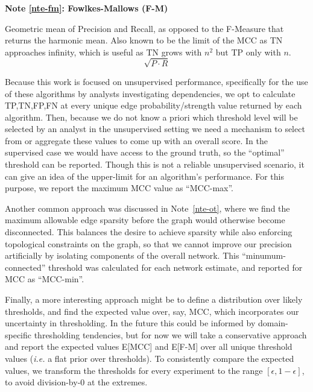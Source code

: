 \documentclass[%
	12pt,
		oneside,
		letterpaper
]{book}
\newcounter{quartocalloutnteno}
\newcommand{\quartocalloutnte}[1]{\refstepcounter{quartocalloutnteno}\label{#1}}
\begin{document}
\begin{tcolorbox}[enhanced jigsaw, bottomrule=.15mm, colback=white, breakable, toprule=.15mm, colframe=quarto-callout-note-color-frame, leftrule=.75mm, arc=.35mm, opacityback=0, rightrule=.15mm, left=2mm]

\quartocalloutnte{nte-fm} 

\vspace{-3mm}\textbf{Note \ref*{nte-fm}: Fowlkes-Mallows (F-M)}\vspace{3mm}

Geometric mean of Precision and Recall, as opposed to the F-Measure that returns the harmonic mean.
Also known to be the limit of the MCC as TN approaches infinity\autocite{MCCapproachesgeometric_Crall2023}, which is useful as TN grows with \(n^2\) but TP only with \(n\).
\[\sqrt{P\cdot R}\]

\end{tcolorbox}

Because this work is focused on unsupervised performance, specifically for the use of these algorithms by analysts investigating dependencies, we opt to calculate TP,TN,FP,FN at every unique edge probability/strength value returned by each algorithm.
Then, because we do not know a priori which threshold level will be selected by an analyst in the unsupervised setting we need a mechanism to select from or aggregate these values to come up with an overall score.
In the supervised case we would have access to the ground truth, so the ``optimal'' threshold can be reported.
Though this is not a reliable unsupervised scenario, it can give an idea of the upper-limit for an algorithm's performance.
For this purpose, we report the maximum MCC value as ``MCC-max''.

Another common approach was discussed in Note~\ref{nte-ot}, where we find the maximum allowable edge sparsity before the graph would otherwise become disconnected.
This balances the desire to achieve sparsity while also enforcing topological constraints on the graph, so that we cannot improve our precision artificially by isolating components of the overall network.
This ``minumum-connected'' threshold was calculated for each network estimate, and reported for MCC as ``MCC-min''.

Finally, a more interesting approach might be to define a distribution over likely thresholds, and find the expected value over, say, MCC, which incorporates our uncertainty in thresholding.
In the future this could be informed by domain-specific thresholding tendencies, but for now we will take a conservative approach and report the expected values E{[}MCC{]} and E{[}F-M{]} over all unique threshold values (\emph{i.e.} a flat prior over thresholds).
To consistently compare the expected values, we transform the thresholds for every experiment to the range \([\epsilon, 1-\epsilon]\), to avoid division-by-0 at the extremes.
\end{document}
